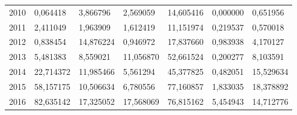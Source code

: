 \begin{table}
\begin{tabular}{p{1cm}p{2cm}p{2cm}p{2cm}p{2cm}p{2cm}p{2cm}}
 2010 &                               0,064418 &                               3,866796 &  2,569059 &                           14,605416 &                              0,000000 &  0,651956 \\
 2011 &                               2,411049 &                               1,963909 &  1,612419 &                           11,151974 &                              0,219537 &  0,570018 \\
 2012 &                               0,838454 &                              14,876224 &  0,946972 &                           17,837660 &                              0,983938 &  4,170127 \\
 2013 &                               5,481383 &                               8,559021 & 11,056870 &                           52,661524 &                              0,200277 &  8,103591 \\
 2014 &                              22,714372 &                              11,985466 &  5,561294 &                           45,377825 &                              0,482051 & 15,529634 \\
 2015 &                              58,157175 &                              10,506634 &  6,780556 &                           77,160857 &                              1,833035 & 18,378892 \\
 2016 &                              82,635142 &                              17,325052 & 17,568069 &                           76,815162 &                              5,454943 & 14,712776 \\
\bottomrule
\end{tabular}
\end{table}
